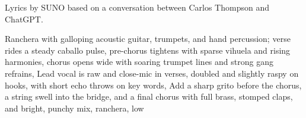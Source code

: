 
\begin{notes}
Lyrics by SUNO based on a conversation between Carlos Thompson and ChatGPT.
\end{notes}
\begin{style}
Ranchera with galloping acoustic guitar, trumpets, and hand percussion; verse rides a steady caballo pulse, pre-chorus tightens with sparse vihuela and rising harmonies, chorus opens wide with soaring trumpet lines and strong gang refrains, Lead vocal is raw and close-mic in verses, doubled and slightly raspy on hooks, with short echo throws on key words, Add a sharp grito before the chorus, a string swell into the bridge, and a final chorus with full brass, stomped claps, and bright, punchy mix, ranchera, low
\end{style}
